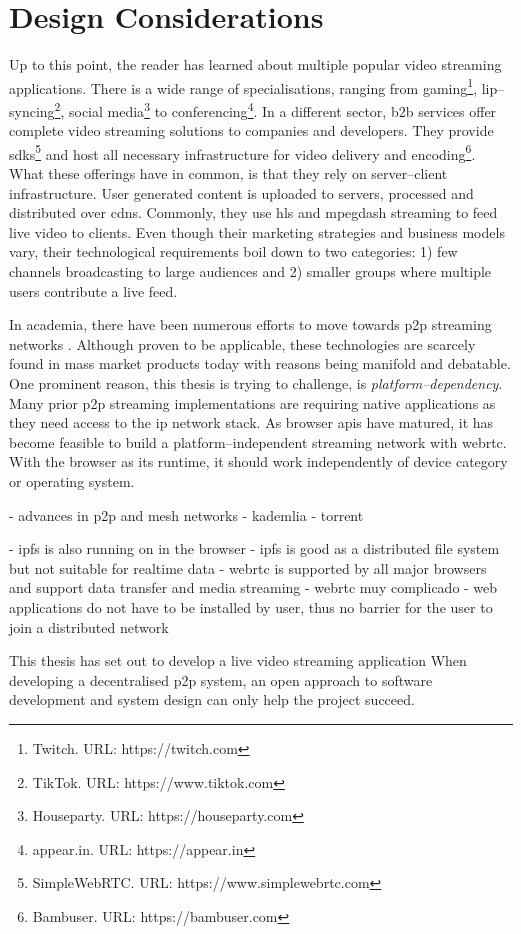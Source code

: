 \section{Design Considerations}

Up to this point, the reader has learned about multiple popular video streaming applications. There is a wide range of specialisations, ranging from gaming\footnote{Twitch. URL: {https://twitch.com}}, lip–syncing\footnote{TikTok. URL: {https://www.tiktok.com}}, social media\footnote{Houseparty. URL: {https://houseparty.com}} to conferencing\footnote{appear.in. URL: {https://appear.in}}. In a different sector, \gls{b2b} services offer complete video streaming solutions to companies and developers. They provide \glspl{sdk}\footnote{SimpleWebRTC. URL: {https://www.simplewebrtc.com}} and host all necessary infrastructure for video delivery and encoding\footnote{Bambuser. URL: {https://bambuser.com}}. What these offerings have in common, is that they rely on server–client infrastructure. User generated content is uploaded to servers, processed and distributed over \glspl{cdn}. Commonly, they use \gls{hls} and \gls{mpegdash} streaming to feed live video to clients. Even though their marketing strategies and business models vary, their technological requirements boil down to two categories: 1) few channels broadcasting to large audiences and 2) smaller groups where multiple users contribute a live feed.

In academia, there have been numerous efforts to move towards \gls{p2p} streaming networks \cite{TODO-ilmstream, coolstreaming, TODO-noch-eins}. Although proven to be applicable\cite{TODO-skype, TODO-etc}, these technologies are scarcely found in mass market products today with reasons being manifold and debatable. One prominent reason, this thesis is trying to challenge, is \textit{platform–dependency}. Many prior \gls{p2p} streaming implementations are requiring native applications as they need access to the \gls{ip} network stack. As browser \glspl{api} have matured, it has become feasible to build a platform–independent streaming network with \gls{webrtc}. With the browser as its runtime, it should work independently of device category or operating system. 

- advances in p2p and mesh networks
- kademlia
- torrent

- ipfs is also running on in the browser
- ipfs is good as a distributed file system but not suitable for realtime data
- webrtc is supported by all major browsers and support data transfer and media streaming
- webrtc muy complicado
- web applications do not have to be installed by user, thus no barrier for the user to join a distributed network 


This thesis has set out to develop a live video streaming application
When developing a decentralised \gls{p2p} system, an open approach to software development and system design can only help the project succeed.
